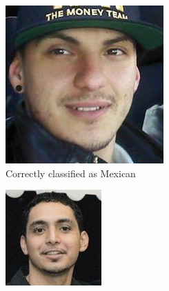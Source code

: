 \begin{figure}[!htb]
    \centering
    \begin{subfigure}[t]{0.3\textwidth}
      \includegraphics[width=\textwidth]{figures/results/misclassification/mexico-mexico.jpg}
      \caption{Correctly classified as Mexican}
    \end{subfigure}
    \begin{subfigure}[t]{0.3\textwidth}
      \includegraphics[width=\textwidth]{figures/results/misclassification/mexico-india.jpg}

\end{subfigure}
\end{figure}
